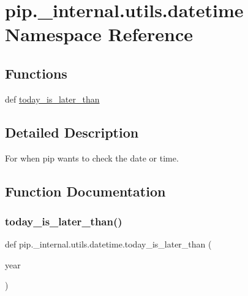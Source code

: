 \hypertarget{namespacepip_1_1__internal_1_1utils_1_1datetime}{}\section{pip.\+\_\+internal.\+utils.\+datetime Namespace Reference}
\label{namespacepip_1_1__internal_1_1utils_1_1datetime}
\subsection*{Functions}
\begin{DoxyCompactItemize}
\item 
def \hyperlink{namespacepip_1_1__internal_1_1utils_1_1datetime_a87ac11cf9e3964fac5a83b0ca37a27fc}{today\+\_\+is\+\_\+later\+\_\+than}
\end{DoxyCompactItemize}


\subsection{Detailed Description}
\begin{DoxyVerb}For when pip wants to check the date or time.
\end{DoxyVerb}
 

\subsection{Function Documentation}
\mbox{\label{namespacepip_1_1__internal_1_1utils_1_1datetime_a87ac11cf9e3964fac5a83b0ca37a27fc}} 
\subsubsection{\texorpdfstring{today\+\_\+is\+\_\+later\+\_\+than()}{today\_is\_later\_than()}}
{\footnotesize\ttfamily def pip.\+\_\+internal.\+utils.\+datetime.\+today\+\_\+is\+\_\+later\+\_\+than (\begin{DoxyParamCaption}\item[{}]{year }\end{DoxyParamCaption})}

